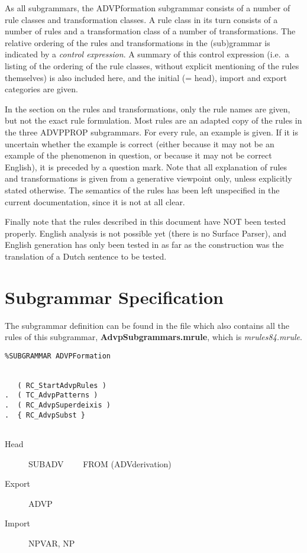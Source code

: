 As all subgrammars, the ADVPformation subgrammar consists of 
a number of rule classes and transformation classes. A rule class in its turn
consists of a number of rules and a transformation class of a number of 
transformations. The relative ordering of the rules and transformations in the
(sub)grammar is indicated by a {\em control expression}. A summary of this
control expression (i.e.\ a listing of the ordering of the rule classes, 
without explicit mentioning of the rules themselves) is also included here, 
and the initial (= head), import and export categories are given. 

In the section on the rules and transformations, only the rule names are given, 
but not the exact rule formulation. Most rules are an adapted copy of the rules 
in the three ADVPPROP subgrammars.
For every rule, an example is given. If it is uncertain whether the example is 
correct (either 
because it may not be an example of the phenomenon in question, or because it 
may not be correct English), it is preceded by a question mark. Note that all 
explanation of rules and transformations is given from a generative viewpoint
only, unless explicitly stated otherwise. The semantics of the rules 
has been left unspecified in the current documentation, since it is not at all 
clear.

Finally note that the rules described in this document have NOT been tested 
properly. English analysis is not possible yet (there is no Surface Parser), and 
English generation has only been tested in as far as the construction was the 
translation of a Dutch sentence to be tested.

\newpage
\section{Subgrammar Specification}
The subgrammar definition can be found in the file which also contains all the 
rules of this subgrammar, {\bf AdvpSubgrammars.mrule}, which is 
{\em mrules84.mrule\/}.

\begin{verbatim}
%SUBGRAMMAR ADVPFormation


   ( RC_StartAdvpRules )
.  ( TC_AdvpPatterns )
.  ( RC_AdvpSuperdeixis )
.  { RC_AdvpSubst }


\end{verbatim}

\begin{description}
  \item[Head]  SUBADV  \ \ \ \ FROM (ADVderivation)
  \item[Export] ADVP
  \item[Import] NPVAR, NP
\end{description}

